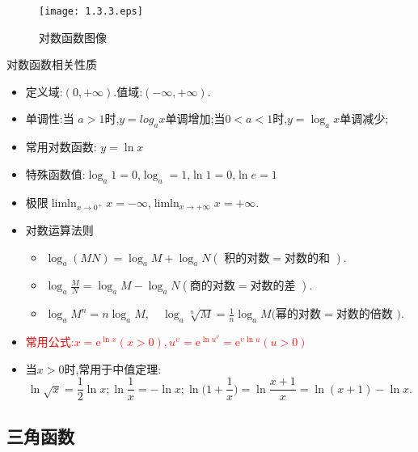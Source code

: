 \documentclass[12pt, a4paper, oneside, UTF8]{ctexbook}  %
\begin{document}
\begin{sloppypar}
    \begin{figure}[H]
        \centering \texttt{[image: 1.3.3.eps]} \caption{对数函数图像}
    \end{figure}
    \begin{criterion}{对数函数相关性质}{}
        \begin{itemize}
            \item 定义域:$(0,+\infty)$.值域:$(-\infty,+\infty)$.
            \item 单调性:当 $a>1$时,$y=log_a x$单调增加;当$0<a<1$时,$y=\log_a x$单调减少;
            \item 常用对数函数: $y=\ln x$
            \item 特殊函数值:$\log_a 1=0$,$\log_a=1$,$\ln 1=0$,$\ln e=1$
            \item 极限$\operatorname*{lim ln}_{x\to0^{+}}x=-\infty$,$\operatorname*{lim ln}_{x\to+\infty}x=+\infty$.
            \item 对数运算法则
                  \begin{itemize}
                      \item $\log_{a}\left(MN\right)=\log_{a}M+\log_{a}N\left(\text{ 积的对数}=\text{对数的和 }\right).$
                      \item $\log_{a}\frac{M}{N}=\log_{a}M-\log_{a}N\left(商的对数=\text{对数的差 }\right).$
                      \item $\log_aM^n=n\log_aM,\quad\log_a\sqrt[n]{M}=\frac1n\log_aM\text{(幂的对数}=\text{对数的倍数 }).$
                  \end{itemize}
            \item \textcolor{red}{常用公式:$x=\mathrm{e}^{\ln x}\left(x>0\right),u^{\upsilon}=\mathrm{e}^{\ln u^v}=\mathrm{e}^{\upsilon\ln u}\left(u>0\right)$}
            \item 当$x>0$时,常用于中值定理:
                  $$
                      \ln\sqrt{x}=\frac{1}{2}\ln x;\ln\frac{1}{x}=-\ln x;\ln\biggl(1+\frac{1}{x}\biggr)=\ln\frac{x+1}{x}=\ln(x+1)-\ln x.
                  $$
        \end{itemize}
    \end{criterion}
    \subsection{三角函数}


\end{sloppypar}
\end{document}
